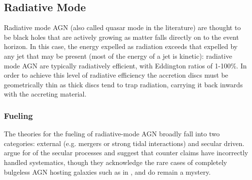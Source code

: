 	\subsection{Radiative Mode}
		\label{subsec:Radiative}
		Radiative mode AGN (also called quasar mode in the literature) are thought to be black holes that are actively growing as matter falls directly on to the event horizon. In this case, the energy expelled as radiation exceeds that expelled by any jet that may be present (most of the energy of a jet is kinetic): radiative mode AGN are typically radiatively efficient, with Eddington ratios of 1-100\%. In order to achieve this level of radiative efficiency the accretion discs must be geometrically thin as thick discs tend to trap radiation, carrying it back inwards with the accreting material. 

		\subsubsection{Fueling}
			\label{subsubsec:RadiativeFueling}
			The theories for the fueling of radiative-mode AGN broadly fall into two categories: external (e.g. mergers or strong tidal interactions) and secular driven. \citet{Heckman2014} argue for of the secular processes and suggest that counter claims have incorrectly handled systematics, though they acknowledge the rare cases of completely bulgeless AGN hosting galaxies such as in \citet{Filippenko1993}, \citet{Satyapal2009} and \citet{Simmons2013} do remain a mystery. 

